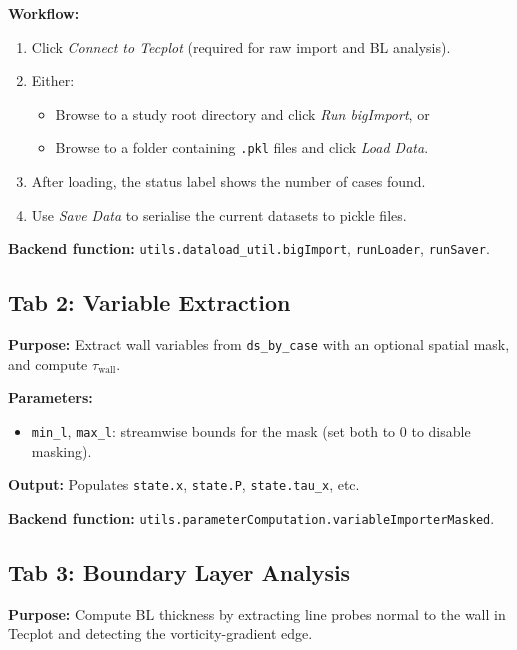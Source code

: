 \documentclass[11pt,letterpaper]{article}
\begin{document}
\textbf{Workflow:}
\begin{enumerate}
  \item Click \emph{Connect to Tecplot} (required for raw import and BL analysis).
  \item Either:
    \begin{itemize}
      \item Browse to a study root directory and click \emph{Run bigImport}, or
      \item Browse to a folder containing \texttt{.pkl} files and click
            \emph{Load Data}.
    \end{itemize}
  \item After loading, the status label shows the number of cases found.
  \item Use \emph{Save Data} to serialise the current datasets to pickle files.
\end{enumerate}

\textbf{Backend function:} \texttt{utils.dataload\_util.bigImport},
\texttt{runLoader}, \texttt{runSaver}.

\subsection{Tab 2: Variable Extraction}

\textbf{Purpose:} Extract wall variables from \texttt{ds\_by\_case} with an
optional spatial mask, and compute $\tau_{\text{wall}}$.

\textbf{Parameters:}
\begin{itemize}
  \item \texttt{min\_l}, \texttt{max\_l}: streamwise bounds for the mask
        (set both to 0 to disable masking).
\end{itemize}

\textbf{Output:} Populates \texttt{state.x}, \texttt{state.P},
\texttt{state.tau\_x}, etc.

\textbf{Backend function:} \texttt{utils.parameterComputation.variableImporterMasked}.

\subsection{Tab 3: Boundary Layer Analysis}

\textbf{Purpose:} Compute BL thickness by extracting line probes normal to the
wall in Tecplot and detecting the vorticity-gradient edge.
\end{document}
